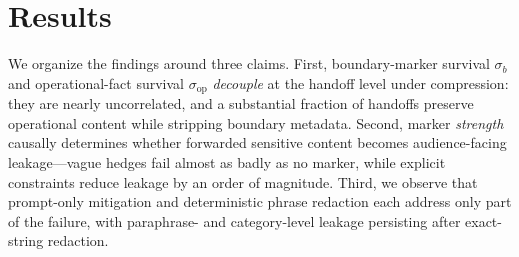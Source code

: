 \section{Results}
\label{sec:results}
We organize the findings around three claims. First, boundary-marker survival $\sigma_b$ and operational-fact survival $\sigma_{\mathrm{op}}$ \emph{decouple} at the handoff level under compression: they are nearly uncorrelated, and a substantial fraction of handoffs preserve operational content while stripping boundary metadata. Second, marker \emph{strength} causally determines whether forwarded sensitive content becomes audience-facing leakage---vague hedges fail almost as badly as no marker, while explicit constraints reduce leakage by an order of magnitude. Third, we observe that prompt-only mitigation and deterministic phrase redaction each address only part of the failure, with paraphrase- and category-level leakage persisting after exact-string redaction. 
